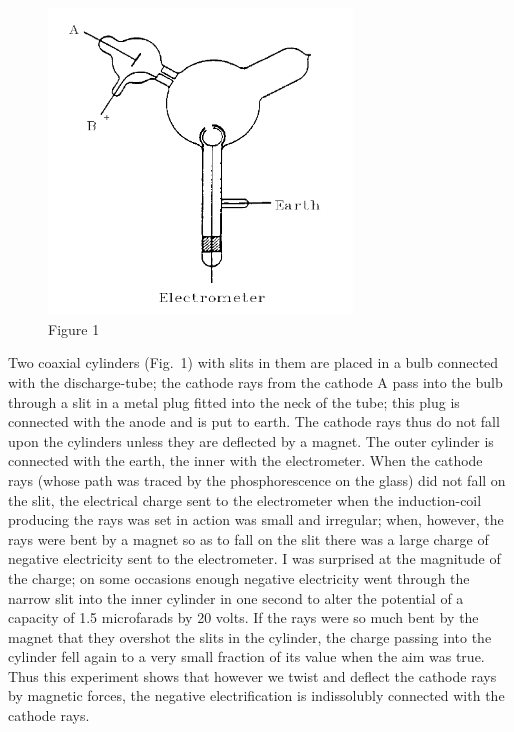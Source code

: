 \begin{figure}
  \begin{center}
    \includegraphics[width=3.17361in,height=3.2in]{images/02_thomson/image007.png}
  \end{center}
  \caption*{Figure 1}
\end{figure}
  

Two coaxial cylinders (Fig.~1) with slits in them are placed in a bulb
connected with the discharge-tube; the cathode rays from the cathode A
pass into the bulb through a slit in a metal plug fitted into the neck
of the tube; this plug is connected with the anode and is put to earth.
The cathode rays thus do not fall upon the cylinders unless they are
deflected by a magnet. The outer cylinder is connected with the earth,
the inner with the electrometer. When the cathode rays (whose path was
traced by the phosphorescence on the glass) did not fall on the slit,
the electrical charge sent to the electrometer when the induction-coil
producing the rays was set in action was small and irregular; when,
however, the rays were bent by a magnet so as to fall on the slit there
was a large charge of negative electricity sent to the electrometer. I
was surprised at the magnitude of the charge; on some occasions enough
negative electricity went through the narrow slit into the inner
cylinder in one second to alter the potential of a capacity of 1.5
microfarads by 20 volts. If the rays were so much bent by the magnet
that they overshot the slits in the cylinder, the charge passing into
the cylinder fell again to a very small fraction of its value when the
aim was true. Thus this experiment shows that however we twist and
deflect the cathode rays by magnetic forces, the negative
electrification is indissolubly connected with the cathode rays.

